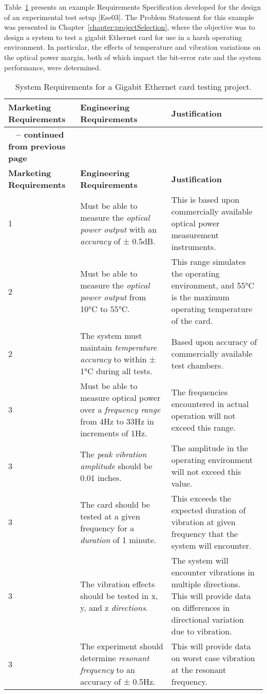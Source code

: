 Table~\ref{table:gigabit} presents an example Requirements Specification developed for
the design of an experimental test setup {[}Ese03{]}. The Problem
Statement for this example was presented in 
Chapter~\ref{chapter:projectSelection}, where the
objective was to design a system to test a gigabit Ethernet card for use
in a harsh operating environment. In particular, the effects of
temperature and vibration variations on the optical power margin, both
of which impact the bit-error rate and the system performance, were
determined.

\begin{longtable}{ |p{2.5cm}|p{5cm}|p{5.5cm}|} 
\caption{System Requirements for a Gigabit Ethernet card testing project.}
\label{table:gigabit}\\
\hline
\rowcolor{Gray}
\textbf{Marketing Requirements} & \textbf{Engineering Requirements} & \textbf{Justification} \\ \hline
\endfirsthead

\hline
\rowcolor{Gray}
\multicolumn{3}{|c|}
{{\bfseries \tablename\ \thetable{} -- continued from previous page}} \\ \hline
\rowcolor{Gray}
\textbf{Marketing Requirements} & \textbf{Engineering Requirements} & \textbf{Justification} \\ \hline
\endhead
\endfoot

1 & Must be able to measure the \emph{optical power output} with an
\emph{accuracy} of ± 0.5dB. & This is based upon commercially available
optical power measurement instruments. \\ \hline
2 & Must be able to measure the \emph{optical power output} from 10°C to
55°C. & This range simulates the operating environment, and 55°C is the
maximum operating temperature of the card. \\ \hline
2 & The system must maintain \emph{temperature accuracy} to within ± 1°C
during all tests. & Based upon accuracy of commercially available test
chambers. \\ \hline
3 & Must be able to measure optical power over a \emph{frequency range}
from 4Hz to 33Hz in increments of 1Hz. & The frequencies encountered in
actual operation will not exceed this range. \\ \hline
3 & The \emph{peak vibration amplitude} should be 0.01 inches. & The
amplitude in the operating environment will not exceed this value. \\ \hline
3 & The card should be tested at a given frequency for a \emph{duration}
of 1 minute. & This exceeds the expected duration of vibration at given
frequency that the system will encounter. \\ \hline
3 & The vibration effects should be tested in x, y, and z
\emph{directions}. & The system will encounter vibrations in multiple
directions. This will provide data on differences in directional
variation due to vibration. \\ \hline
3 & The experiment should determine \emph{resonant frequency} to an
accuracy of ± 0.5Hz. & This will provide data on worst case vibration at
the resonant frequency. \\ \hline


\end{longtable}
